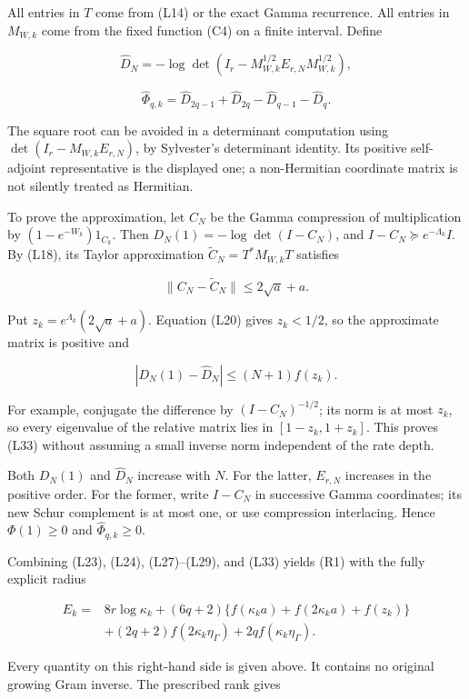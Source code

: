 \documentclass[11pt,a4paper]{article}
\begin{document}
All entries in \(T\) come from (L14) or the exact Gamma recurrence. All entries in \(M_{W,k}\) come from the fixed function (C4) on a finite interval. Define

\[
\widehat D_N=-\log\det(I_r-M_{W,k}^{1/2}E_{r,N}M_{W,k}^{1/2}),
\]

\[
\boxed{\widehat\Phi_{q,k}
=\widehat D_{2q-1}+\widehat D_{2q}-\widehat D_{q-1}-\widehat D_q.}
\tag{L32}
\]

The square root can be avoided in a determinant computation using
\(\det(I_r-M_{W,k}E_{r,N})\), by Sylvester's determinant identity. Its positive self-adjoint representative is the displayed one; a non-Hermitian coordinate matrix is not silently treated as Hermitian.

To prove the approximation, let \(C_N\) be the Gamma compression of multiplication by \((1-e^{-W_k})1_{C_k}\). Then
\(D_N(1)=-\log\det(I-C_N)\), and \(I-C_N\succeq e^{-\Lambda_k}I\).
By (L18), its Taylor approximation \(\widetilde C_N=T^*M_{W,k}T\) satisfies

\[
\|C_N-\widetilde C_N\|\le2\sqrt a+a.
\]

Put \(z_k=e^{\Lambda_k}(2\sqrt a+a)\). Equation (L20) gives \(z_k<1/2\), so the approximate matrix is positive and

\[
|D_N(1)-\widehat D_N|\le(N+1)f(z_k).
\tag{L33}
\]

For example, conjugate the difference by \((I-C_N)^{-1/2}\); its norm is at most \(z_k\), so every eigenvalue of the relative matrix lies in \([1-z_k,1+z_k]\). This proves (L33) without assuming a small inverse norm independent of the rate depth.

Both \(D_N(1)\) and \(\widehat D_N\) increase with \(N\). For the latter, \(E_{r,N}\) increases in the positive order. For the former, write \(I-C_N\) in successive Gamma coordinates; its new Schur complement is at most one, or use compression interlacing. Hence \(\Phi(1)\ge0\) and \(\widehat\Phi_{q,k}\ge0\).

Combining (L23), (L24), (L27)--(L29), and (L33) yields (R1) with the fully explicit radius

\[
\boxed{\begin{aligned}
E_k={}&8r\log\kappa_k+(6q+2)
\{f(\kappa_k a)+f(2\kappa_k a)+f(z_k)\}\\
&+(2q+2)f(2\kappa_k\eta_\Gamma)
+2qf(\kappa_k\eta_\Gamma).
\end{aligned}}
\tag{L34}
\]

Every quantity on this right-hand side is given above. It contains no original growing Gram inverse. The prescribed rank gives
\end{document}
